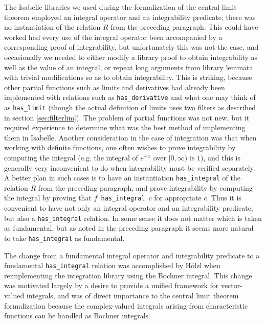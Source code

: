 \documentclass[leqno]{article}
\theoremstyle{definition}
\begin{document}
The Isabelle libraries we used during the formalization of the central limit theorem employed an integral operator and an integrability predicate; there was no instantiation of the relation $R$ from the preceding paragraph. This could have worked had every use of the integral operator been accompanied by a corresponding proof of integrability, but unfortunately this was not the case, and occasionally we needed to either modify a library proof to obtain integrability as well as the value of an integral, or repeat long arguments from library lemmata with trivial modifications so as to obtain integrability. This is striking, because other partial functions such as limits and derivatives had already been implemented with relations such as \texttt{has\_derivative} and what one may think of as \texttt{has\_limit} (though the actual definition of limits uses two filters as described in section \ref{sec:filterlim}). The problem of partial functions was not new, but it required experience to determine what was the best method of implementing them in Isabelle. Another consideration in the case of integration was that when working with definite functions, one often wishes to prove integrability by computing the integral (e.g. the integral of $e^{-x}$ over $[0, \infty)$ is $1$), and this is generally very inconvenient to do when integrability must be verified separately. A better plan in such cases is to have an instantiation \texttt{has\_integral} of the relation $R$ from the preceding paragraph, and prove integrability by computing the integral by proving that \texttt{$f$ has\_integral $c$} for appropriate $c$. Thus it is convenient to have not only an integral operator and an integrability predicate, but also a \texttt{has\_integral} relation. In some sense it does not matter which is taken as fundamental, but as noted in the preceding paragraph it seems more natural to take \texttt{has\_integral} as fundamental.

The change from a fundamental integral operator and integrability predicate to a fundamental \texttt{has\_integral} relation was accomplished by H\"olzl when reimplementing the integration library using the Bochner integral. This change was motivated largely by a desire to provide a unified framework for vector-valued integrals, and was of direct importance to the central limit theorem formalization because the complex-valued integrals arising from characteristic functions can be handled as Bochner integrals.
\end{document}
